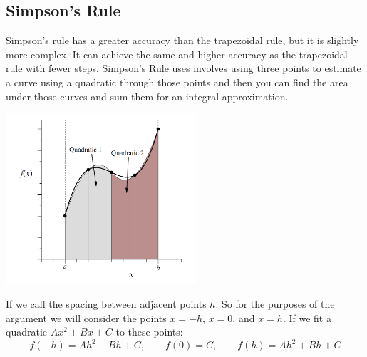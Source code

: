         \subsection{Simpson's Rule}
            Simpson's rule has a greater accuracy than the trapezoidal rule, but it is slightly more complex. It can achieve the same and higher accuracy as the trapezoidal rule with fewer steps. 
            \newline \indent
            Simpson's Rule uses involves using three points to estimate a curve using a quadratic through those points and then you can find the area under those curves and sum them for an integral approximation. 
            \begin{center}
                \includegraphics[width=200pt]{simpsons_rule.png}
            \end{center}
            If we call the spacing between adjacent points $h$. So for the purposes of the argument we will consider the points $x = -h$, $x = 0$, and $x = h$. If we fit a quadratic $Ax^2 + Bx + C$ to these points:
            \begin{equation*}
                f(-h) = Ah^2 - Bh + C, \qquad f(0) = C, \qquad f(h) = Ah^2 + Bh + C
            \end{equation*}
             